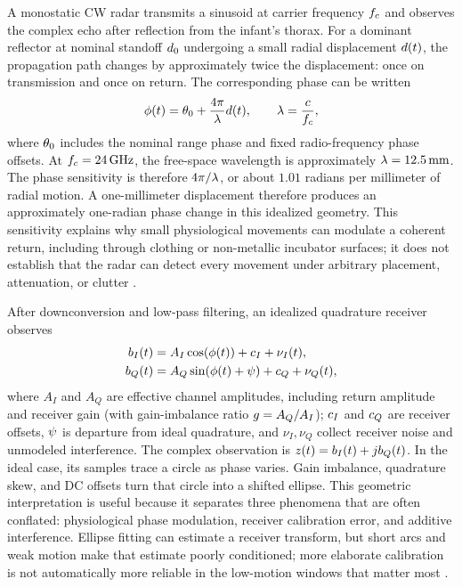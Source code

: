 A monostatic CW radar transmits a sinusoid at carrier frequency $f_c$ and observes the
complex echo after reflection from the infant's thorax. For a dominant reflector at nominal
standoff $d_0$ undergoing a small radial displacement $d(t)$, the propagation path
changes by approximately twice the displacement: once on transmission and once on return. The
corresponding phase can be written
\begin{equation}
  \phi(t) = \theta_0 + \frac{4\pi}{\lambda}d(t),
  \qquad \lambda = \frac{c}{f_c},
  \label{eq:ch2_radar_phase}
\end{equation}
where $\theta_0$ includes the nominal range phase and fixed radio-frequency phase offsets. At
$f_c=24\,\mathrm{GHz}$, the free-space wavelength is approximately
$\lambda=12.5\,\mathrm{mm}$. The phase sensitivity is therefore
$4\pi/\lambda$, or about $1.01$ radians per millimeter of radial motion. A one-millimeter
displacement therefore produces an approximately one-radian phase change in this idealized
geometry. This sensitivity explains why small physiological movements can modulate a coherent
return, including through clothing or non-metallic incubator surfaces; it does not establish that
the radar can detect every movement under arbitrary placement, attenuation, or clutter
\citep{droitcour2004range,li2013review,hu2014noncontact}.

After downconversion and low-pass filtering, an idealized quadrature receiver observes
\begin{align}
  b_I(t) &= A_I\cos(\phi(t))+c_I+\nu_I(t),\nonumber\\
  b_Q(t) &= A_Q\sin(\phi(t)+\psi)+c_Q+\nu_Q(t),
  \label{eq:ch2_iq_model}
\end{align}
where $A_I$ and $A_Q$ are effective channel amplitudes, including return amplitude and receiver
gain (with gain-imbalance ratio $g = A_Q/A_I$); $c_I$ and $c_Q$ are receiver offsets,
$\psi$ is departure from ideal quadrature, and $\nu_I,\nu_Q$ collect receiver noise
and unmodeled interference. The complex observation is $z(t)=b_I(t)+jb_Q(t)$. In the ideal
case, its samples trace a circle as phase varies. Gain imbalance, quadrature skew, and DC offsets
turn that circle into a shifted ellipse. This geometric interpretation is useful because it
separates three phenomena that are often conflated: physiological phase modulation, receiver
calibration error, and additive interference. Ellipse fitting can estimate a receiver transform,
but short arcs and weak motion make that estimate poorly conditioned; more elaborate calibration
is not automatically more reliable in the low-motion windows that matter most
\citep{park2007arctangent,singh2013data,zakrzewski2014quadrature,fitzgibbon1999direct}.

